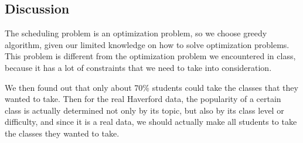 \documentclass[11pt, oneside]{article}   	%
\begin{document}


\subsection{Discussion}
The scheduling problem is an optimization problem, so we choose greedy algorithm, given our limited knowledge on how to solve optimization problems. This problem is different from the optimization problem we encountered in class, because it has a lot of constraints that we need to take into consideration.




We then found out that only about 70\% students could take the classes that they wanted to take. Then for the real Haverford data, the popularity of a certain class is actually determined not only by its topic, but also by its class level or difficulty, and since it is a real data, we should actually make all students to take the classes they wanted to take. 
\end{document}
